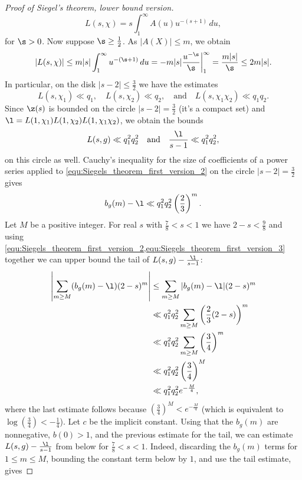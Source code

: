 \begin{proof}[Proof of Siegel's theorem, lower bound version]
      \[
        L(s,\chi) = s\int_{1}^{\infty}A(u)u^{-(s+1)}\,du,
      \]
      for $\s > 0$. Now suppose $\s \ge \frac{1}{2}$. As $|A(X)| \le m$, we obtain
      \[
        |L(s,\chi)| \le m|s|\int_{1}^{\infty}u^{-(\s+1)}\,du = -m|s|\frac{u^{-\s}}{\s}\bigg|_{1}^{\infty} = \frac{m|s|}{\s} \le 2m|s|.
      \]
      In particular, on the disk $|s-2| \le \frac{3}{2}$ we have the estimates
      \[
        L(s,\chi_{1}) \ll q_{1}, \quad L(s,\chi_{2}) \ll q_{2}, \quad \text{and} \quad L(s,\chi_{1}\chi_{2}) \ll q_{1}q_{2}.
      \]
      Since $\z(s)$ is bounded on the circle $|s-2| = \frac{3}{2}$ (it's a compact set) and $\l = L(1,\chi_{1})L(1,\chi_{2})L(1,\chi_{1}\chi_{2})$, we obtain the bounds
      \[
        L(s,g) \ll q_{1}^{2}q_{2}^{2} \quad \text{and} \quad \frac{\l}{s-1} \ll q_{1}^{2}q_{2}^{2},
      \]
      on this circle as well. Cauchy's inequality for the size of coefficients of a power series applied to \cref{equ:Siegels_theorem_first_version_2} on the circle $|s-2| = \frac{3}{2}$ gives
      \begin{equation}\label{equ:Siegels_theorem_first_version_3}
        b_{g}(m)-\l \ll q_{1}^{2}q_{2}^{2}\left(\frac{2}{3}\right)^{m}.
      \end{equation}
      Let $M$ be a positive integer. For real $s$ with $\frac{7}{8} < s < 1$ we have $2-s < \frac{9}{8}$ and using \cref{equ:Siegels_theorem_first_version_2,equ:Siegels_theorem_first_version_3} together we can upper bound the tail of $L(s,g)-\frac{\l}{s-1}$:
      \begin{align*}
        \left|\sum_{m \ge M}(b_{g}(m)-\l)(2-s)^{m}\right| &\le \sum_{m \ge M}|b_{g}(m)-\l|(2-s)^{m} \\
        &\ll q_{1}^{2}q_{2}^{2}\sum_{m \ge M}\left(\frac{2}{3}(2-s)\right)^{m} \\
        &\ll q_{1}^{2}q_{2}^{2}\sum_{m \ge M}\left(\frac{3}{4}\right)^{m} \\
        &\ll q_{1}^{2}q_{2}^{2}\left(\frac{3}{4}\right)^{M} \\
        &\ll q_{1}^{2}q_{2}^{2}e^{-\frac{M}{4}},
      \end{align*}
      where the last estimate follows because $(\frac{3}{4})^{M} < e^{-\frac{M}{4}}$ (which is equivalent to $\log\left(\frac{3}{4}\right) < -\frac{1}{4}$). Let $c$ be the implicit constant. Using that the $b_{g}(m)$ are nonnegative, $b(0) > 1$, and the previous estimate for the tail, we can estimate $L(s,g)-\frac{\l}{s-1}$ from below for $\frac{7}{8} < s < 1$. Indeed, discarding the $b_{g}(m)$ terms for $1 \le m \le M$, bounding the constant term below by $1$, and use the tail estimate, gives

\end{proof}
